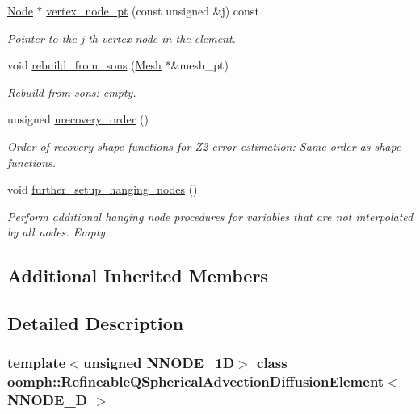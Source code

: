\begin{DoxyCompactItemize}
\hyperlink{classoomph_1_1Node}{Node} $\ast$ \hyperlink{classoomph_1_1RefineableQSphericalAdvectionDiffusionElement_af835676dba7c709266afe91006465b97}{vertex\+\_\+node\+\_\+pt} (const unsigned \&j) const
\begin{DoxyCompactList}\small\item\em Pointer to the j-\/th vertex node in the element. \end{DoxyCompactList}\item 
void \hyperlink{classoomph_1_1RefineableQSphericalAdvectionDiffusionElement_a8c2063c57db484970fcb35b220f7043e}{rebuild\+\_\+from\+\_\+sons} (\hyperlink{classoomph_1_1Mesh}{Mesh} $\ast$\&mesh\+\_\+pt)
\begin{DoxyCompactList}\small\item\em Rebuild from sons\+: empty. \end{DoxyCompactList}\item 
unsigned \hyperlink{classoomph_1_1RefineableQSphericalAdvectionDiffusionElement_a7ebf5133adf3d34fc30ce9b7c2ee2ef8}{nrecovery\+\_\+order} ()
\begin{DoxyCompactList}\small\item\em Order of recovery shape functions for Z2 error estimation\+: Same order as shape functions. \end{DoxyCompactList}\item 
void \hyperlink{classoomph_1_1RefineableQSphericalAdvectionDiffusionElement_a0ad422bfa10c757b2cbc3d56209ea642}{further\+\_\+setup\+\_\+hanging\+\_\+nodes} ()
\begin{DoxyCompactList}\small\item\em Perform additional hanging node procedures for variables that are not interpolated by all nodes. Empty. \end{DoxyCompactList}\end{DoxyCompactItemize}
\subsection*{Additional Inherited Members}


\subsection{Detailed Description}
\subsubsection*{template$<$unsigned N\+N\+O\+D\+E\+\_\+1D$>$\newline
class oomph\+::\+Refineable\+Q\+Spherical\+Advection\+Diffusion\+Element$<$ N\+N\+O\+D\+E\+\_\+D $>$}


